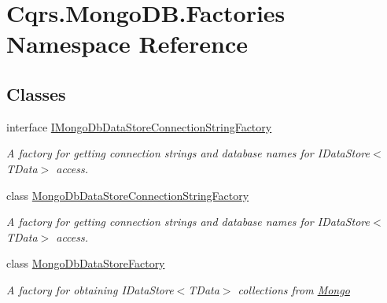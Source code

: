 \hypertarget{namespaceCqrs_1_1MongoDB_1_1Factories}{}\section{Cqrs.\+Mongo\+D\+B.\+Factories Namespace Reference}
\label{namespaceCqrs_1_1MongoDB_1_1Factories}
\subsection*{Classes}
\begin{DoxyCompactItemize}
\item 
interface \hyperlink{interfaceCqrs_1_1MongoDB_1_1Factories_1_1IMongoDbDataStoreConnectionStringFactory}{I\+Mongo\+Db\+Data\+Store\+Connection\+String\+Factory}
\begin{DoxyCompactList}\small\item\em A factory for getting connection strings and database names for I\+Data\+Store$<$\+T\+Data$>$ access. \end{DoxyCompactList}\item 
class \hyperlink{classCqrs_1_1MongoDB_1_1Factories_1_1MongoDbDataStoreConnectionStringFactory}{Mongo\+Db\+Data\+Store\+Connection\+String\+Factory}
\begin{DoxyCompactList}\small\item\em A factory for getting connection strings and database names for I\+Data\+Store$<$\+T\+Data$>$ access. \end{DoxyCompactList}\item 
class \hyperlink{classCqrs_1_1MongoDB_1_1Factories_1_1MongoDbDataStoreFactory}{Mongo\+Db\+Data\+Store\+Factory}
\begin{DoxyCompactList}\small\item\em A factory for obtaining I\+Data\+Store$<$\+T\+Data$>$ collections from \hyperlink{namespaceCqrs_1_1Mongo}{Mongo} \end{DoxyCompactList}\end{DoxyCompactItemize}
